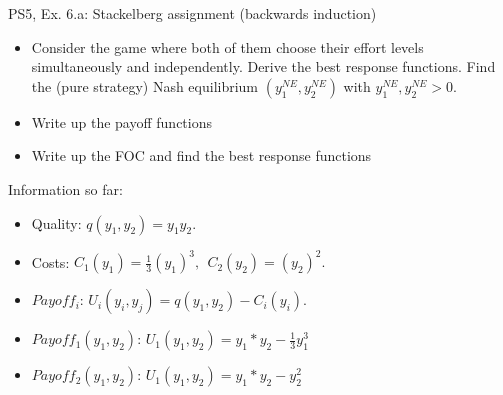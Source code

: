 \begin{frame}{PS5, Ex. 6.a: Stackelberg assignment (backwards induction)}
    \begin{itemize}
    \item[(a)] Consider the game where both of them choose their effort levels simultaneously and independently. Derive the best response functions. Find the (pure strategy) Nash equilibrium $(y_1^{NE}, y_2^{NE})$ with $y_1^{NE}, y_2^{NE} > 0$.
    \end{itemize}
    \vfill\null
  \begin{multicols}{2}
    \begin{itemize}
      \item[(Step 1)] Write up the payoff functions
      \item[(Step 2)] Write up the FOC and find the best response functions
    \end{itemize}
    \vfill\null \columnbreak
    Information so far:
    \begin{itemize}
    \item[1] Quality: $q(y_1, y_2) = y_1y_2.$\\
    \item[2] Costs: $C_1(y_1) = \frac{1}{3}(y_1)^3,\ \ C_2(y_2) = (y_2)^2.$\\
    \item[3] $Payoff_i$: $U_i(y_i,y_j) = q(y_1,y_2)-C_i(y_i).$ \\
    \item[4] $Payoff_1(y_1,y_2)$: $U_1(y_1,y_2) = y_1*y_2-\frac{1}{3}y_1^3$ \\
    \item[5] $Payoff_2(y_1,y_2)$: $U_1(y_1,y_2) = y_1*y_2-y_2^2$ \\
    \end{itemize}
    \vfill\null
  \end{multicols}
\end{frame}

